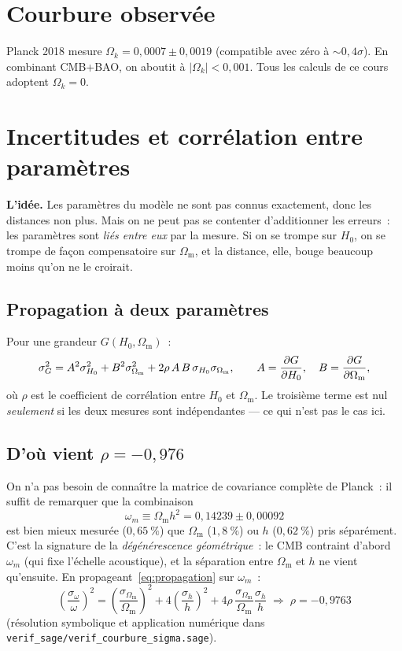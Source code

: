 \documentclass[11pt,a4paper,openany]{report}
\newcommand{\Hzero}{H_{0}}
\newcommand{\Om}{\Omega_{\mathrm{m}}}
\newcommand{\Ok}{\Omega_{k}}
\begin{document}
\section{Courbure observée}
\label{sec:Ok}

Planck 2018 mesure $\Ok = 0{,}0007 \pm 0{,}0019$ (compatible avec zéro à
$\sim 0{,}4\sigma$). En combinant CMB+BAO, on aboutit à $|\Ok| < 0{,}001$.
Tous les calculs de ce cours adoptent $\Ok = 0$.

\section{Incertitudes et corrélation entre paramètres}
\label{sec:incertitudes}

\begin{tcolorbox}[vulgarisation]
\textbf{L'idée.} Les paramètres du modèle ne sont pas connus exactement, donc
les distances non plus. Mais on ne peut pas se contenter d'additionner les
erreurs~: les paramètres sont \emph{liés entre eux} par la mesure. Si on se
trompe sur $\Hzero$, on se trompe de façon compensatoire sur $\Om$, et la
distance, elle, bouge beaucoup moins qu'on ne le croirait.
\end{tcolorbox}

\subsection{Propagation à deux paramètres}

\begin{tcolorbox}[mathspe]
Pour une grandeur $G(\Hzero, \Om)$~:
\begin{equation}
\sigma_G^{2} = A^{2}\sigma_{\Hzero}^{2} + B^{2}\sigma_{\Om}^{2}
             + 2\rho\,A\,B\,\sigma_{\Hzero}\sigma_{\Om},
\qquad A = \pdv{G}{\Hzero},\quad B = \pdv{G}{\Om},
\label{eq:propagation}
\end{equation}
où $\rho$ est le coefficient de corrélation entre $\Hzero$ et $\Om$. Le
troisième terme est nul \emph{seulement} si les deux mesures sont
indépendantes --- ce qui n'est pas le cas ici.
\end{tcolorbox}

\subsection{D'où vient $\rho = -0{,}976$}

On n'a pas besoin de connaître la matrice de covariance complète de Planck~:
il suffit de remarquer que la combinaison
\[
\omega_{m} \equiv \Om h^{2} = 0{,}14239 \pm 0{,}00092
\]
est bien mieux mesurée ($0{,}65~\%$) que $\Om$ ($1{,}8~\%$) ou $h$
($0{,}62~\%$) pris séparément. C'est la signature de la
\emph{dégénérescence géométrique}~: le CMB contraint d'abord $\omega_m$ (qui
fixe l'échelle acoustique), et la séparation entre $\Om$ et $h$ ne vient
qu'ensuite. En propageant~\eqref{eq:propagation} sur $\omega_m$~:
\[
\left(\frac{\sigma_{\omega}}{\omega}\right)^{2}
 = \left(\frac{\sigma_{\Om}}{\Om}\right)^{2}
 + 4\left(\frac{\sigma_{h}}{h}\right)^{2}
 + 4\rho\,\frac{\sigma_{\Om}}{\Om}\frac{\sigma_{h}}{h}
\;\Longrightarrow\;
\boxed{\rho = -0{,}9763}
\]
(résolution symbolique et application numérique dans
\texttt{verif\_sage/verif\_courbure\_sigma.sage}).
\end{document}
